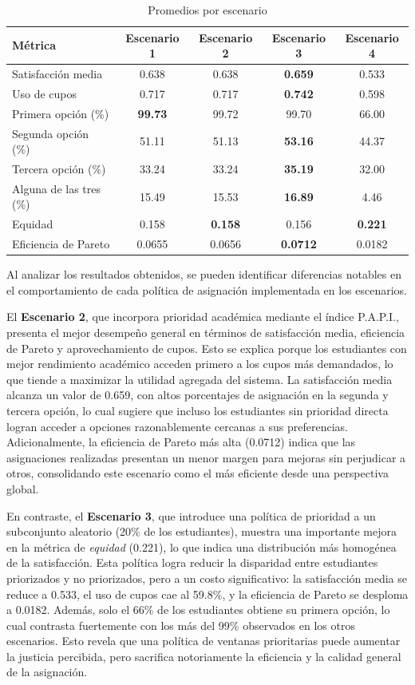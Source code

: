 \documentclass{article}
\begin{document}
\begin{table}[H]
\centering
\caption{Promedios por escenario}
\begin{tabular}{lcccc}
\toprule
\textbf{Métrica} & \textbf{Escenario 1} & \textbf{Escenario 2} & \textbf{Escenario 3} & \textbf{Escenario 4} \\
\midrule
Satisfacción media & 0.638 & 0.638 & \textbf{0.659} & 0.533 \\
Uso de cupos & 0.717 & 0.717 & \textbf{0.742} & 0.598 \\
Primera opción (\%) & \textbf{99.73} & 99.72 & 99.70 & 66.00 \\
Segunda opción (\%) & 51.11 & 51.13 & \textbf{53.16} & 44.37 \\
Tercera opción (\%) & 33.24 & 33.24 & \textbf{35.19} & 32.00 \\
Alguna de las tres (\%) & 15.49 & 15.53 & \textbf{16.89} & 4.46 \\
Equidad & 0.158 & \textbf{0.158} & 0.156 & \textbf{0.221} \\
Eficiencia de Pareto & 0.0655 & 0.0656 & \textbf{0.0712} & 0.0182 \\
\bottomrule
\end{tabular}
\end{table}

\noindent Al analizar los resultados obtenidos, se pueden identificar diferencias notables en el comportamiento de cada política de asignación implementada en los escenarios.

El \textbf{Escenario 2}, que incorpora prioridad académica mediante el índice P.A.P.I., presenta el mejor desempeño general en términos de satisfacción media, eficiencia de Pareto y aprovechamiento de cupos. Esto se explica porque los estudiantes con mejor rendimiento académico acceden primero a los cupos más demandados, lo que tiende a maximizar la utilidad agregada del sistema. La satisfacción media alcanza un valor de 0.659, con altos porcentajes de asignación en la segunda y tercera opción, lo cual sugiere que incluso los estudiantes sin prioridad directa logran acceder a opciones razonablemente cercanas a sus preferencias. Adicionalmente, la eficiencia de Pareto más alta (0.0712) indica que las asignaciones realizadas presentan un menor margen para mejoras sin perjudicar a otros, consolidando este escenario como el más eficiente desde una perspectiva global.

En contraste, el \textbf{Escenario 3}, que introduce una política de prioridad a un subconjunto aleatorio (20\% de los estudiantes), muestra una importante mejora en la métrica de \textit{equidad} (0.221), lo que indica una distribución más homogénea de la satisfacción. Esta política logra reducir la disparidad entre estudiantes priorizados y no priorizados, pero a un costo significativo: la satisfacción media se reduce a 0.533, el uso de cupos cae al 59.8\%, y la eficiencia de Pareto se desploma a 0.0182. Además, solo el 66\% de los estudiantes obtiene su primera opción, lo cual contrasta fuertemente con los más del 99\% observados en los otros escenarios. Esto revela que una política de ventanas prioritarias puede aumentar la justicia percibida, pero sacrifica notoriamente la eficiencia y la calidad general de la asignación.
\end{document}
